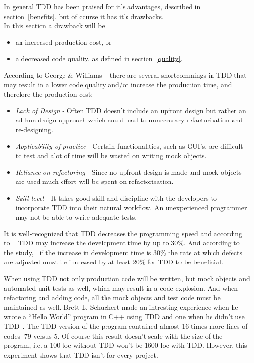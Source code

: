 In general TDD has been praised for it's advantages, described in section~\ref{benefits}, but of course it has it's drawbacks.\\

\noindent In this section a drawback will be:
\begin{itemize}
\item an increased production cost, or
\item a decreased code quality, as defined in section~\ref{quality}.
\end{itemize}

According to George \& Williams ~\cite{georgeandwilliams} there are several shortcommings in TDD that may result in a lower code quality and/or increase the production time, and therefore the production cost:
\begin{itemize}
 \item \textit{Lack of Design} - Often TDD doesn't include an upfront design but rather an ad hoc design approach which could lead to unnecessary refactorisation and re-designing. 
 \item \textit{Applicability of practice} - Certain functionalities, such as GUI's, are difficult to test and alot of time will be wasted on writing mock objects.
 \item \textit{Reliance on refactoring} - Since no upfront design is made and mock objects are used much effort will be spent on refactorisation.
 \item \textit{Skill level} - It takes good skill and discipline with the developers to incorporate TDD into their natural workflow. An unexperienced programmer may not be able to write adequate tests.\\
\end{itemize}

\noindent It is well-recognized that TDD decreases the programming speed and according to ~\cite{microsoftibm} TDD may increase the development time by up to 30\%. 
And according to the study,~\cite{tddroi} if the increase in development time is 30\% the rate at which defects are adjusted must be increased by at least 20\% for TDD to be beneficial.

\noindent When using TDD not only production code will be written, but mock objects and automated unit tests as well, which may result in a code explosion. And when refactoring and adding code, all the mock objects and test code must be maintained as well. Brett L. Schuchert made an intresting experience when he wrote a ``Hello World'' program in C++ using TDD and one when he didn't use TDD~\cite{helloworld}. 
The TDD version of the program contained almost 16 times more lines of codes, 79 versus 5. Of course this result doesn't scale with the size of the program, i.e. a 100 loc without TDD won't be 1600 loc with TDD. However, this experiment shows that TDD isn't for every project.
